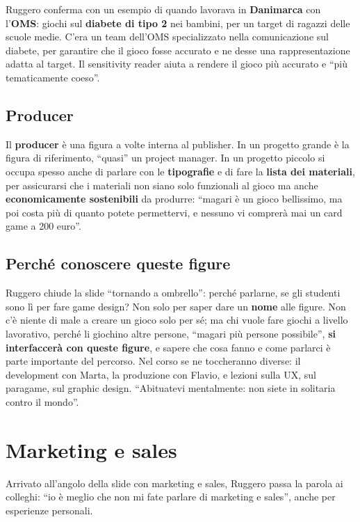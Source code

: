 Ruggero conferma con un esempio di quando lavorava in \textbf{Danimarca} con
l'\textbf{OMS}: giochi sul \textbf{diabete di tipo 2} nei bambini, per un target
di ragazzi delle scuole medie. C'era un team dell'OMS specializzato nella
comunicazione sul diabete, per garantire che il gioco fosse accurato e ne desse
una rappresentazione adatta al target. Il sensitivity reader aiuta a rendere il
gioco più accurato e ``più tematicamente coeso''.

\subsection{Producer}

Il \textbf{producer} è una figura a volte interna al publisher. In un progetto
grande è la figura di riferimento, ``quasi'' un project manager. In un progetto
piccolo si occupa spesso anche di parlare con le \textbf{tipografie} e di fare la
\textbf{lista dei materiali}, per assicurarsi che i materiali non siano solo
funzionali al gioco ma anche \textbf{economicamente sostenibili} da produrre:
``magari è un gioco bellissimo, ma poi costa più di quanto potete permettervi, e
nessuno vi comprerà mai un card game a 200 euro''.

\subsection{Perché conoscere queste figure}

Ruggero chiude la slide ``tornando a ombrello'': perché parlarne, se gli studenti
sono lì per fare game design? Non solo per saper dare un \textbf{nome} alle
figure. Non c'è niente di male a creare un gioco solo per sé; ma chi vuole fare
giochi a livello lavorativo, perché li giochino altre persone, ``magari più
persone possibile'', \textbf{si interfaccerà con queste figure}, e sapere che
cosa fanno e come parlarci è parte importante del percorso. Nel corso se ne
toccheranno diverse: il development con Marta, la produzione con Flavio, e
lezioni sulla UX, sul paragame, sul graphic design. ``Abituatevi mentalmente:
non siete in solitaria contro il mondo''.

\section{Marketing e sales}
\label{a1:sec:marketing}

Arrivato all'angolo della slide con marketing e sales, Ruggero passa la parola
ai colleghi: ``io è meglio che non mi fate parlare di marketing e sales'', anche
per esperienze personali.

